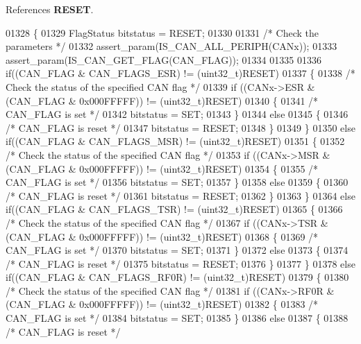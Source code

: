 References \textbf{ R\+E\+S\+ET}.


\begin{DoxyCode}
01328 \{
01329   FlagStatus bitstatus = RESET;
01330   
01331   \textcolor{comment}{/* Check the parameters */}
01332   assert_param(IS_CAN_ALL_PERIPH(CANx));
01333   assert_param(IS_CAN_GET_FLAG(CAN\_FLAG));
01334   
01335 
01336   \textcolor{keywordflow}{if}((CAN\_FLAG & CAN_FLAGS_ESR) != (uint32\_t)RESET)
01337   \{ 
01338     \textcolor{comment}{/* Check the status of the specified CAN flag */}
01339     \textcolor{keywordflow}{if} ((CANx->ESR & (CAN\_FLAG & 0x000FFFFF)) != (uint32\_t)RESET)
01340     \{ 
01341       \textcolor{comment}{/* CAN\_FLAG is set */}
01342       bitstatus = SET;
01343     \}
01344     \textcolor{keywordflow}{else}
01345     \{ 
01346       \textcolor{comment}{/* CAN\_FLAG is reset */}
01347       bitstatus = RESET;
01348     \}
01349   \}
01350   \textcolor{keywordflow}{else} \textcolor{keywordflow}{if}((CAN\_FLAG & CAN_FLAGS_MSR) != (uint32\_t)RESET)
01351   \{ 
01352     \textcolor{comment}{/* Check the status of the specified CAN flag */}
01353     \textcolor{keywordflow}{if} ((CANx->MSR & (CAN\_FLAG & 0x000FFFFF)) != (uint32\_t)RESET)
01354     \{ 
01355       \textcolor{comment}{/* CAN\_FLAG is set */}
01356       bitstatus = SET;
01357     \}
01358     \textcolor{keywordflow}{else}
01359     \{ 
01360       \textcolor{comment}{/* CAN\_FLAG is reset */}
01361       bitstatus = RESET;
01362     \}
01363   \}
01364   \textcolor{keywordflow}{else} \textcolor{keywordflow}{if}((CAN\_FLAG & CAN_FLAGS_TSR) != (uint32\_t)RESET)
01365   \{ 
01366     \textcolor{comment}{/* Check the status of the specified CAN flag */}
01367     \textcolor{keywordflow}{if} ((CANx->TSR & (CAN\_FLAG & 0x000FFFFF)) != (uint32\_t)RESET)
01368     \{ 
01369       \textcolor{comment}{/* CAN\_FLAG is set */}
01370       bitstatus = SET;
01371     \}
01372     \textcolor{keywordflow}{else}
01373     \{ 
01374       \textcolor{comment}{/* CAN\_FLAG is reset */}
01375       bitstatus = RESET;
01376     \}
01377   \}
01378   \textcolor{keywordflow}{else} \textcolor{keywordflow}{if}((CAN\_FLAG & CAN_FLAGS_RF0R) != (uint32\_t)RESET)
01379   \{ 
01380     \textcolor{comment}{/* Check the status of the specified CAN flag */}
01381     \textcolor{keywordflow}{if} ((CANx->RF0R & (CAN\_FLAG & 0x000FFFFF)) != (uint32\_t)RESET)
01382     \{ 
01383       \textcolor{comment}{/* CAN\_FLAG is set */}
01384       bitstatus = SET;
01385     \}
01386     \textcolor{keywordflow}{else}
01387     \{ 
01388       \textcolor{comment}{/* CAN\_FLAG is reset */}

\end{DoxyCode}
